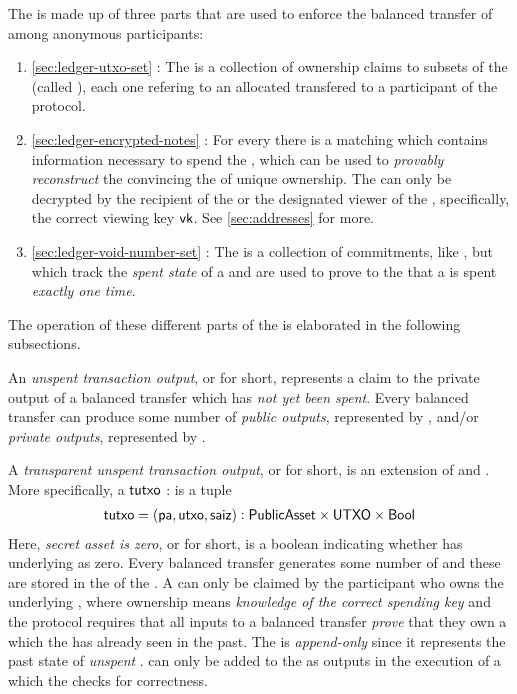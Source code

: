 The \ShieldedAssetPool{} is made up of three parts that are used to enforce the balanced transfer of  among anonymous participants:

\begin{enumerate}
    \item \autoref{sec:ledger-utxo-set} \TUTXOSet{}: The \TUTXOSet{} is a collection of ownership claims to subsets of the \ShieldedAssetPool{} (called ), each one refering to an allocated \SecretAsset{} transfered to a participant of the protocol.
    \item \autoref{sec:ledger-encrypted-notes} : For every \UTXO{} there is a matching \EncryptedNote{} which contains information necessary to spend the \SecretAsset{}, which can be used to \emph{provably reconstruct} the \UTXO{} convincing the \Ledger{} of unique ownership. The \EncryptedNote{} can only be decrypted by the recipient of the \SecretAsset{} or the designated viewer of the \UTXO{}, specifically, the correct viewing key ${\textsf{vk}}$. See \autoref{sec:addresses} for more.
    \item \autoref{sec:ledger-void-number-set} \VoidNumberSet{}: The \VoidNumberSet{} is a collection of commitments, like , but which track the \emph{spent state} of a \SecretAsset{} and are used to prove to the \Ledger{} that a \SecretAsset{} is spent \emph{exactly one time}. 
\end{enumerate}

The operation of these different parts of the \ShieldedAssetPool{} is elaborated in the following subsections.


An \emph{unspent transaction output}, or \UTXO{} for short, represents a claim to the private output of a balanced transfer which has 
\emph{not yet been spent}. Every balanced transfer can produce some number of \emph{public outputs}, represented by , and/or 
\emph{private outputs}, represented by .

A \emph{transparent unspent transaction output}, or \TUTXO{} for short, is an extension of \PublicAsset{} and \UTXO{}. More specifically, a 
${\textsf{tutxo}}$ : \TUTXO{} is a tuple 
\begin{align*}
    {\textsf{tutxo}} = ({\textsf{pa}}, {\textsf{utxo}}, {\textsf{saiz}}) : {\textsf{PublicAsset}} \times {\textsf{UTXO}} \times {\textsf{Bool}}
\end{align*}
Here, \emph{secret asset is zero}, or \saiz{} for short, is a boolean indicating whether \utxo{} has underlying \AssetValue{}
as zero. Every balanced transfer generates some number of  and these  are stored in the \TUTXOSet{} 
of the \ShieldedAssetPool{}. A \TUTXO{} can only be claimed by the participant who owns the underlying \SecretAsset{}, where ownership means 
\emph{knowledge of the correct spending key} and the \Transfer{} protocol requires that all inputs to a balanced transfer \emph{prove} 
that they own a \TUTXO{} which the \ShieldedAssetPool{} has already seen in the past.
The \TUTXOSet{} is \emph{append-only} since it represents the past state of \emph{unspent} .  can only be added to the 
\TUTXOSet{} as outputs in the execution of a \Transfer{} which the \Ledger{} checks for correctness.

